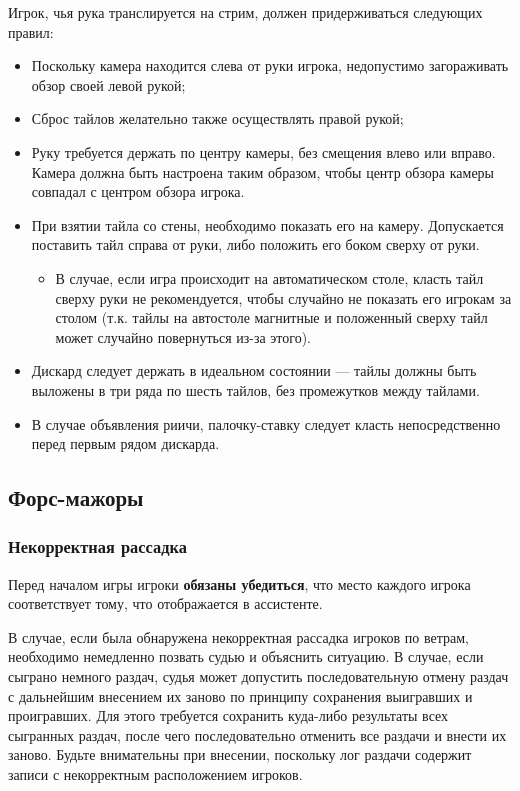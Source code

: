 Игрок, чья рука транслируется на стрим, должен придерживаться следующих правил:
\begin{itemize}
	\item Поскольку камера находится слева от руки игрока, недопустимо загораживать обзор своей левой рукой;
	\item Сброс тайлов желательно также осуществлять правой рукой;
	\item Руку требуется держать по центру камеры, без смещения влево или вправо. Камера должна быть настроена таким образом, чтобы центр обзора камеры совпадал с центром обзора игрока.
	\item При взятии тайла со стены, необходимо показать его на камеру. Допускается поставить тайл справа от руки, либо положить его боком сверху от руки. 
	\begin{itemize}
		\item В случае, если игра происходит на автоматическом столе, класть тайл сверху руки не рекомендуется, чтобы случайно не показать его игрокам за столом (т.к. тайлы на автостоле магнитные и положенный сверху тайл может случайно повернуться из-за этого).
	\end{itemize}
	\item Дискард следует держать в идеальном состоянии --- тайлы должны быть выложены в три ряда по шесть тайлов, без промежутков между тайлами. 
	\item В случае объявления риичи, палочку-ставку следует класть непосредственно перед первым рядом дискарда.
\end{itemize}

\subsection{Форс-мажоры}

\subsubsection{Некорректная рассадка}

Перед началом игры игроки \textbf{обязаны убедиться}, что место каждого игрока соответствует тому, что отображается в ассистенте.

В случае, если была обнаружена некорректная рассадка игроков по ветрам, необходимо немедленно позвать судью и объяснить ситуацию. В случае, если сыграно немного раздач, судья может допустить последовательную отмену раздач с дальнейшим внесением их заново по принципу сохранения выигравших и проигравших. Для этого требуется сохранить куда-либо результаты всех сыгранных раздач, после чего последовательно отменить все раздачи и внести их заново. Будьте внимательны при внесении, поскольку лог раздачи содержит записи с некорректным расположением игроков.

